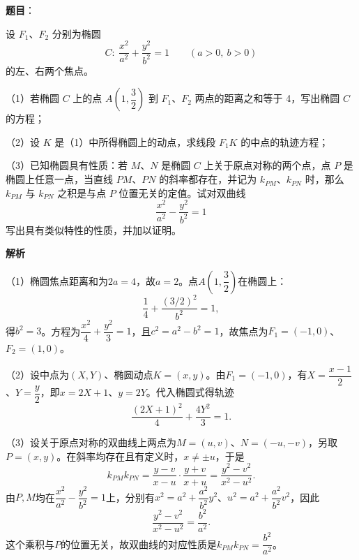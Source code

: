 \begin{answer}

\textbf{题目}：

设 $F_1$、$F_2$ 分别为椭圆
\nopagebreak[4]
\[
C:\ \dfrac{x^2}{a^2}+\dfrac{y^2}{b^2}=1\qquad(a>0,\ b>0)
\]
的左、右两个焦点。

（1）若椭圆 $C$ 上的点 $A\left(1,\dfrac32\right)$ 到 $F_1$、$F_2$ 两点的距离之和等于 4，写出椭圆 $C$ 的方程；

（2）设 $K$ 是（1）中所得椭圆上的动点，求线段 $F_1K$ 的中点的轨迹方程；

（3）已知椭圆具有性质：若 $M$、$N$ 是椭圆 $C$ 上关于原点对称的两个点，点 $P$ 是椭圆上任意一点，当直线 $PM$、$PN$ 的斜率都存在，并记为 $k_{PM}$、$k_{PN}$ 时，那么 $k_{PM}$ 与 $k_{PN}$ 之积是与点 $P$ 位置无关的定值。试对双曲线
\nopagebreak[4]
\[
\dfrac{x^2}{a^2}-\dfrac{y^2}{b^2}=1
\]
写出具有类似特性的性质，并加以证明。

\textbf{解析}

（1）椭圆焦点距离和为$2a=4$，故$a=2$。点$A(1,\dfrac32)$在椭圆上：
\nopagebreak[4]
\[
\frac14+\frac{(3/2)^2}{b^2}=1,
\]
得$b^2=3$。方程为$\dfrac{x^2}{4}+\dfrac{y^2}{3}=1$，且$c^2=a^2-b^2=1$，故焦点为$F_1=(-1,0)$、$F_2=(1,0)$。

（2）设中点为$(X,Y)$、椭圆动点$K=(x,y)$。由$F_1=(-1,0)$，有$X=\dfrac{x-1}{2}$、$Y=\dfrac y2$，即$x=2X+1$、$y=2Y$。代入椭圆式得轨迹
\nopagebreak[4]
\[
\frac{(2X+1)^2}{4}+\frac{4Y^2}{3}=1.
\]

（3）设关于原点对称的双曲线上两点为$M=(u,v)$、$N=(-u,-v)$，另取$P=(x,y)$。在斜率均存在且有定义时，$x\ne\pm u$，于是
\nopagebreak[4]
\[
k_{PM}k_{PN}
=\frac{y-v}{x-u}\cdot\frac{y+v}{x+u}
=\frac{y^2-v^2}{x^2-u^2}.
\]
由$P,M$均在$\dfrac{x^2}{a^2}-\dfrac{y^2}{b^2}=1$上，分别有$x^2=a^2+\dfrac{a^2}{b^2}y^2$、$u^2=a^2+\dfrac{a^2}{b^2}v^2$，因此
\nopagebreak[4]
\[
\frac{y^2-v^2}{x^2-u^2}=\frac{b^2}{a^2}.
\]
这个乘积与$P$的位置无关，故双曲线的对应性质是$k_{PM}k_{PN}=\dfrac{b^2}{a^2}$。


\end{answer}
